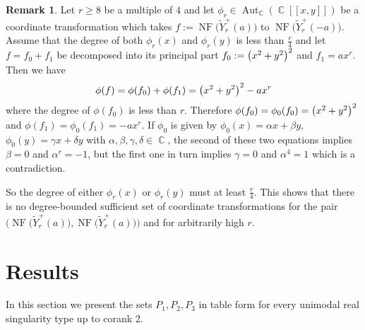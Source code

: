\documentclass{amsproc}
\theoremstyle{definition}
\newtheorem{remark}[theorem]{Remark}
\let\originalleft\left
\let\originalright\right
\renewcommand{\left}{\mathopen{}\mathclose\bgroup\originalleft}
\renewcommand{\right}{\aftergroup\egroup\originalright}
\newcommand{\tY}{\widetilde{Y}}
\DeclareMathOperator{\C}{\mathbb{C}}
\DeclareMathOperator{\NF}{NF}
\DeclareMathOperator{\Aut}{Aut}
\begin{document}
\begin{remark}\label{rem:sufficient_sets_for_Yr}
Let $r \geq 8$ be a multiple of $4$ and let $\phi_r \in \Aut_{\C}(\C[[x,y]])$
be a coordinate transformation which takes $f := \NF\bigl(\tY_r^+(a)\bigr)$ to
$\NF\bigl(\tY_r^+(-a)\bigr)$. Assume that the degree of both $\phi_r(x)$ and
$\phi_r(y)$ is less than $\frac{r}{4}$ and let $f = f_0 + f_1$ be decomposed
into its principal part $f_0 := \left(x^2+y^2\right)^2$ and $f_1 = ax^r$. Then
we have
\[
\phi(f) = \phi(f_0) + \phi(f_1) = \left(x^2+y^2\right)^2 - ax^r
\]
where the degree of $\phi(f_0)$ is less than $r$. Therefore
$\phi(f_0) = \phi_0(f_0) = \left(x^2+y^2\right)^2$ and
$\phi(f_1) = \phi_0(f_1) = -ax^r$. If $\phi_0$ is given by
$\phi_0(x) = \alpha x + \beta y$, $\phi_0(y) = \gamma x + \delta y$ with
$\alpha, \beta, \gamma, \delta \in \C$, the second of these two equations
implies $\beta = 0$ and $\alpha^r = -1$, but the first one in turn implies
$\gamma = 0$ and $\alpha^4 = 1$ which is a contradiction.

So the degree of either $\phi_r(x)$ or $\phi_r(y)$ must at least $\frac{r}{4}$.
This shows that there is no degree-bounded sufficient set of coordinate
transformations for the pair
$\bigl(\NF\bigl(\tY_r^+(a)\bigr), \NF\bigl(\tY_r^+(a)\bigr)\bigr)$ and for
arbitrarily high $r$.
\end{remark}


\section{Results}\label{sec:results}

In this section we present the sets $P_1,P_2,P_3$ in table form for every
unimodal real singularity type up to corank 2.
\end{document}
